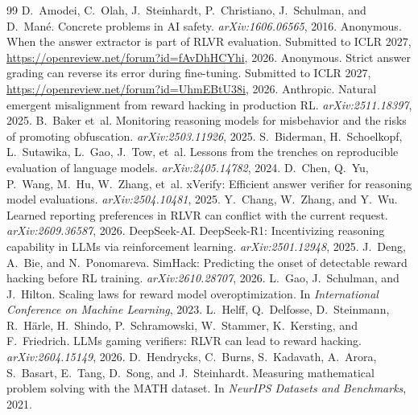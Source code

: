 \documentclass[10pt]{article}
\begin{document}
\begin{thebibliography}{99}\small
{} D.~Amodei, C.~Olah, J.~Steinhardt, P.~Christiano, J.~Schulman, and D.~Man\'e. Concrete problems in {AI} safety. \emph{arXiv:1606.06565}, 2016.
 Anonymous. When the answer extractor is part of {RLVR} evaluation. Submitted to ICLR 2027, \url{https://openreview.net/forum?id=fAvDhHCYhi}, 2026.
 Anonymous. Strict answer grading can reverse its error during fine-tuning. Submitted to ICLR 2027, \url{https://openreview.net/forum?id=UhmEBtU38i}, 2026.
 Anthropic. Natural emergent misalignment from reward hacking in production {RL}. \emph{arXiv:2511.18397}, 2025.
 B.~Baker et~al. Monitoring reasoning models for misbehavior and the risks of promoting obfuscation. \emph{arXiv:2503.11926}, 2025.
 S.~Biderman, H.~Schoelkopf, L.~Sutawika, L.~Gao, J.~Tow, et~al. Lessons from the trenches on reproducible evaluation of language models. \emph{arXiv:2405.14782}, 2024.
 D.~Chen, Q.~Yu, P.~Wang, M.~Hu, W.~Zhang, et~al. {xVerify}: Efficient answer verifier for reasoning model evaluations. \emph{arXiv:2504.10481}, 2025.
 Y.~Chang, W.~Zhang, and Y.~Wu. Learned reporting preferences in {RLVR} can conflict with the current request. \emph{arXiv:2609.36587}, 2026.
 DeepSeek-AI. {DeepSeek-R1}: Incentivizing reasoning capability in {LLMs} via reinforcement learning. \emph{arXiv:2501.12948}, 2025.
 J.~Deng, A.~Bie, and N.~Ponomareva. {SimHack}: Predicting the onset of detectable reward hacking before {RL} training. \emph{arXiv:2610.28707}, 2026.
 L.~Gao, J.~Schulman, and J.~Hilton. Scaling laws for reward model overoptimization. In \emph{International Conference on Machine Learning}, 2023.
 L.~Helff, Q.~Delfosse, D.~Steinmann, R.~H\"arle, H.~Shindo, P.~Schramowski, W.~Stammer, K.~Kersting, and F.~Friedrich. {LLMs} gaming verifiers: {RLVR} can lead to reward hacking. \emph{arXiv:2604.15149}, 2026.
 D.~Hendrycks, C.~Burns, S.~Kadavath, A.~Arora, S.~Basart, E.~Tang, D.~Song, and J.~Steinhardt. Measuring mathematical problem solving with the {MATH} dataset. In \emph{NeurIPS Datasets and Benchmarks}, 2021.

\end{thebibliography}
\end{document}
